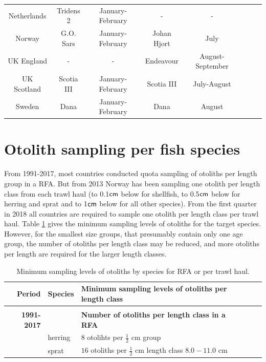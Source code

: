 \documentclass[a4paper 12pt]{article}
\numberwithin{equation}{section}
\newcommand{\cm}{\textnormal{\sffamily cm}\xspace}
\begin{document}
\begin{appendices}
\begin{small}
\begin{table}[h!]
\begin{tabular}{cccccccc}
Netherlands &  Tridens 2 &  January-February   & - & -     \\[1ex]
Norway  &   G.O. Sars  & January-February &    Johan Hjort  & July   \\[1ex]
UK England &- & -&  Endeavour &  August-September  \\[1ex]
UK Scotland   &  Scotia III &  January-February & Scotia III &  July-August \\[1ex]
Sweden  &  Dana &  January-February  &  Dana &  August                  \\[0.5ex]
\hline
\end{tabular}
\end{table}
\end{small}

\section{Otolith sampling per fish species}
\label{sec:otolithappendix}
From 1991-2017, most countries conducted quota sampling of otoliths per length group in a RFA. But from 2013 Norway has been sampling one otolith per length class from each trawl haul (to 0.1$\cm$ below for shellfish, to 0.5$\cm$ below for herring and sprat and to 1$\cm$ below for all other species). From the first quarter in 2018 all countries are required to sample one otolith per length class per trawl haul.  Table \ref{otolithsTable} gives the minimum sampling levels of otoliths for the target species. However, for the smallest size groups, that presumably contain only one age group, the number of otoliths per length class may be reduced, and more otoliths per length are required for the larger length classes.\\ 
\begin{small}
\begin{table}[h!]
\centering
\caption{Minimum sampling levels of otoliths by species for RFA or per trawl haul.}
\label{otolithsTable}
\begin{tabularx}{\linewidth}{r l l l l X}
\toprule 
Period &  Species  & Minimum sampling levels of otoliths per length class    \\[0.7ex]
\midrule \\[0.5ex]
{\bf 1991-2017} & & {\bf Number of otoliths per length class in a RFA}  \\[1.8ex]
     & herring  &  $8$  otolihts per $\frac{1}{2}$ cm group \\[0.8ex]
     & sprat    & $16$  otoliths per $\frac{1}{2}$ cm length class  $8.0 -11.0$ cm\\[0.8ex]

\end{tabularx}
\end{table}
\end{small}
\end{appendices}
\end{document}
